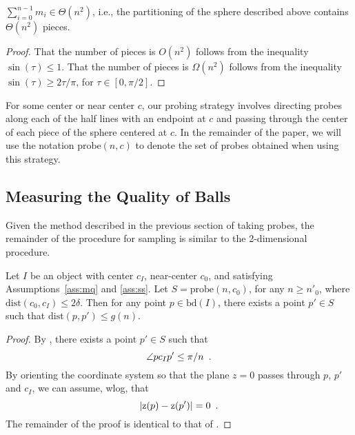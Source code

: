 \documentclass[11pt]{article}
\newcommand{\bd}{\mathrm{bd}}
\newcommand{\dist}{\mathrm{dist}}
\newcommand{\probe}{\mathrm{probe}}
\newcommand{\z}{\mathrm{z}}
\begin{document}
\begin{lem}
$\sum_{i=0}^{n-1}m_i\in\Theta(n^2)$, i.e., the partitioning of the
sphere described above contains $\Theta(n^2)$ pieces.
\end{lem}

\begin{proof}
That the number of pieces is $O(n^2)$ follows from the inequality
$\sin(\tau)\le 1$.  That the number of pieces is $\Omega(n^2)$ follows
from the inequality $\sin(\tau)\ge 2\tau/\pi$, for $\tau\in[0,\pi/2]$.
\end{proof}

For some center or near center $c$, our probing strategy involves
directing probes along each of the half lines with an endpoint at $c$
and passing through the center of each piece of the sphere centered at
$c$.  In the remainder of the paper, we will use the notation
$\probe(n,c)$ to denote the set of probes obtained when using this
strategy.

\subsection{Measuring the Quality of Balls}

Given the method described in the previous section of taking probes,
the remainder of the procedure for sampling is similar to the
2-dimensional procedure.

\begin{lem}
Let $I$ be an object with center $c_I$, near-center $c_0$, and
satisfying Assumptions~\ref{ass:mq} and \ref{ass:ss}.  Let
$S=\probe(n,c_0)$, for any $n\ge n'_0$, where $\dist(c_0,c_I)\le
2\delta$.  Then for any point $p\in\bd(I)$, there exists a point
$p'\in S$ such that $\dist(p,p')\le g(n)$.
\end{lem}

\begin{proof}
By , there exists a point $p'\in S$ such that 
\begin{equation}
\angle pc_Ip'\le \pi/n \enspace .  \eqlabel{little-angle}
\end{equation}  
By orienting the coordinate system so that the plane
$z=0$ passes through $p$, $p'$ and $c_I$, we can assume, wlog, that
\begin{equation}
|\z(p)-\z(p')|=0\enspace . \eqlabel{sin-z-bound}
\end{equation}
The remainder of the proof is identical to that of .
\end{proof}
\end{document}
